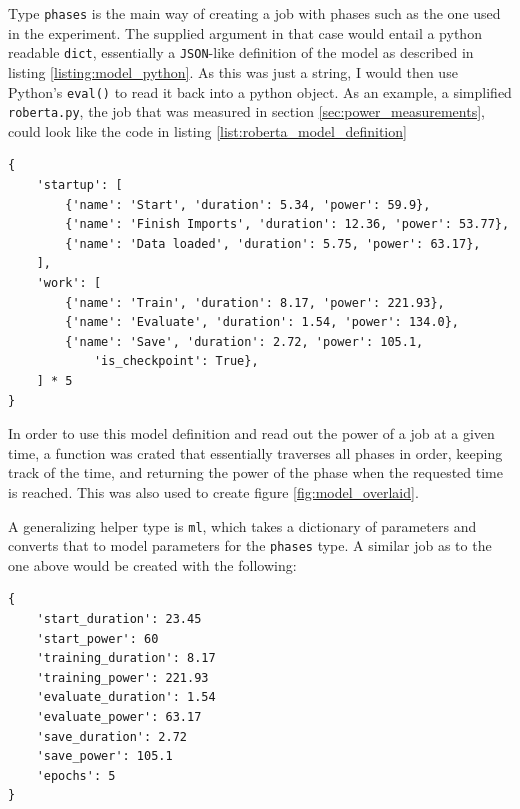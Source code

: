Type \verb|phases| is the main way of creating a job with phases such as the one used in the experiment. The supplied argument in that case would entail a python readable \verb|dict|, essentially a \verb|JSON|-like definition of the model as described in listing \ref{listing:model_python}.
As this was just a string, I would then use Python's \verb|eval()| to read it back into a python object.
As an example, a simplified \verb|roberta.py|, the job that was measured in section \ref{sec:power_measurements}, could look like the code in listing \ref{list:roberta_model_definition}

\begin{lstlisting}[frame=single, numbers=none, caption={Simplified definition for a job similar to the experiment}, label={list:roberta_model_definition}, basicstyle=\ttfamily]
{
    'startup': [
        {'name': 'Start', 'duration': 5.34, 'power': 59.9},
        {'name': 'Finish Imports', 'duration': 12.36, 'power': 53.77},
        {'name': 'Data loaded', 'duration': 5.75, 'power': 63.17}, 
    ],
    'work': [
        {'name': 'Train', 'duration': 8.17, 'power': 221.93}, 
        {'name': 'Evaluate', 'duration': 1.54, 'power': 134.0}, 
        {'name': 'Save', 'duration': 2.72, 'power': 105.1,
            'is_checkpoint': True}, 
    ] * 5
}
\end{lstlisting}

In order to use this model definition and read out the power of a job at a given time, a function was crated that essentially traverses all phases in order, keeping track of the time, and returning the power of the phase when the requested time is reached. 
This was also used to create figure \ref{fig:model_overlaid}.

A generalizing helper type is \verb|ml|, which takes a dictionary of parameters and converts that to model parameters for the \verb|phases| type. A similar job as to the one above would be created with the following:

\begin{lstlisting}[frame=single, numbers=none, caption={Generic model definition for machine learning jobs}, label={list:roberta_model_definition_generic}, basicstyle=\ttfamily]
{
    'start_duration': 23.45
    'start_power': 60
    'training_duration': 8.17
    'training_power': 221.93
    'evaluate_duration': 1.54
    'evaluate_power': 63.17
    'save_duration': 2.72
    'save_power': 105.1
    'epochs': 5
}
\end{lstlisting}

